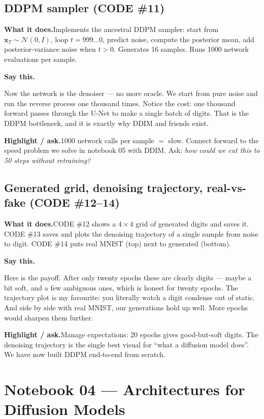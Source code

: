\documentclass[11pt]{article}
\newenvironment{saythis}{%
  \par\smallskip\noindent
  \begin{list}{}{%
    \setlength{\leftmargin}{1.2em}%
    \setlength{\rightmargin}{0.5em}%
    \setlength{\topsep}{2pt}%
  }\item\relax
  \color{sayrule}\textbf{Say this.}\hspace{0.4em}\color{black}\itshape
}{%
  \end{list}\par\smallskip
}
\newcommand{\highlight}[1]{\par\smallskip\noindent\textcolor{hlcolor}{\textbf{Highlight / ask.}}\hspace{0.4em}#1\par\smallskip}
\newcommand{\whatdoes}[1]{\par\noindent\textbf{What it does.}\hspace{0.4em}#1\par}
\begin{document}
\subsection{DDPM sampler (CODE \#11)}
\whatdoes{Implements the ancestral DDPM sampler: start from $\mathbf{x}_T\sim\mathcal{N}(0,I)$, loop
$t=999\ldots0$, predict noise, compute the posterior mean, add posterior-variance noise when $t>0$.
Generates 16 samples. Runs 1000 network evaluations per sample.}
\begin{saythis}
Now the network is the denoiser --- no more oracle. We start from pure noise and run the reverse process
one thousand times. Notice the cost: one thousand forward passes through the U-Net to make a single
batch of digits. That is the DDPM bottleneck, and it is exactly why DDIM and friends exist.
\end{saythis}
\highlight{1000 network calls per sample $=$ slow. Connect forward to the speed problem we solve in
notebook 05 with DDIM. Ask: \emph{how could we cut this to 50 steps without retraining?}}

\subsection{Generated grid, denoising trajectory, real-vs-fake (CODE \#12--14)}
\whatdoes{CODE \#12 shows a $4\times4$ grid of generated digits and saves it. CODE \#13 saves and plots
the denoising trajectory of a single sample from noise to digit. CODE \#14 puts real MNIST (top) next to
generated (bottom).}
\begin{saythis}
Here is the payoff. After only twenty epochs these are clearly digits --- maybe a bit soft, and a few
ambiguous ones, which is honest for twenty epochs. The trajectory plot is my favourite: you literally
watch a digit condense out of static. And side by side with real MNIST, our generations hold up well.
More epochs would sharpen them further.
\end{saythis}
\highlight{Manage expectations: 20 epochs gives good-but-soft digits. The denoising trajectory is the
single best visual for ``what a diffusion model does''. We have now built DDPM end-to-end from scratch.}

\section{Notebook 04 --- Architectures for Diffusion Models}
\end{document}
